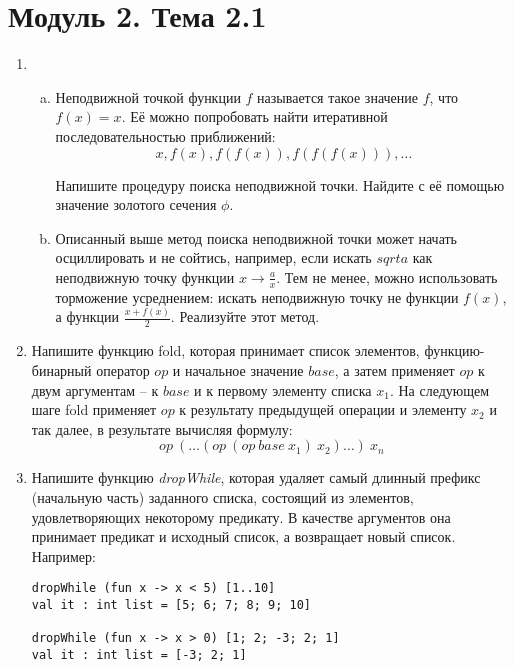 \documentclass[a4paper,11pt]{article}
\begin{document}
\section*{Модуль 2. Тема 2.1}
\begin{enumerate}[{2-}1]
\item \begin{enumerate}[(a)]
\item Неподвижной точкой функции $f$ называется такое значение $f$, что 
$f(x) = x$. Её можно попробовать найти итеративной последовательностью
приближений:
\begin{equation*}
  x, f(x), f(f(x)), f(f(f(x))), \ldots
\end{equation*}

Напишите процедуру поиска неподвижной точки. Найдите с её помощью значение
золотого сечения $\phi$.

\item Описанный выше метод поиска неподвижной точки может начать осциллировать
и не сойтись, например, если искать $sqrt{a}$ как неподвижную точку функции
$x \rightarrow \frac{a}{x}$. Тем не менее, можно использовать торможение
усреднением: искать неподвижную точку не функции $f(x)$, а функции
$\frac{x+f(x)}{2}$. Реализуйте этот метод.
\end{enumerate}

\item Напишите функцию fold, которая принимает список элементов, 
функцию-бинарный оператор $op$ и начальное значение $base$, а затем применяет
$op$ к двум аргументам -- к $base$ и к первому элементу списка $x_1$. На
следующем шаге fold применяет $op$ к результату предыдущей операции и элементу
$x_2$ и так далее, в результате вычисляя формулу:
\begin{equation*}
  op~(\ldots (op~(op~base~x_1)~x_2) \ldots)~x_n
\end{equation*}

\item Напишите функцию \emph{dropWhile}, которая удаляет самый длинный префикс
(начальную часть) заданного списка, состоящий из элементов, удовлетворяющих
некоторому предикату. В качестве аргументов она принимает предикат и исходный
список, а возвращает новый список. Например:

\begin{lstlisting}
dropWhile (fun x -> x < 5) [1..10]
val it : int list = [5; 6; 7; 8; 9; 10]

dropWhile (fun x -> x > 0) [1; 2; -3; 2; 1]
val it : int list = [-3; 2; 1]


\end{lstlisting}
\end{enumerate}
\end{document}
